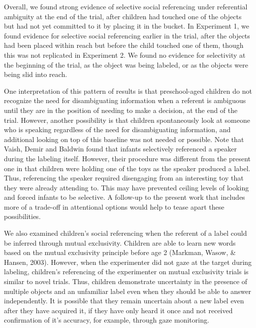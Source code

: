 \documentclass[10pt, letterpaper]{article}
\begin{document}
Overall, we found strong evidence of selective social referencing under
referential ambiguity at the end of the trial, after children had
touched one of the objects but had not yet committed to it by placing it
in the bucket. In Experiment 1, we found evidence for selective social
referencing earlier in the trial, after the objects had been placed
within reach but before the child touched one of them, though this was
not replicated in Experiment 2. We found no evidence for selectivity at
the beginning of the trial, as the object was being labeled, or as the
objects were being slid into reach.

One interpretation of this pattern of results is that preschool-aged
children do not recognize the need for disambiguating information when a
referent is ambiguous until they are in the position of needing to make
a decision, at the end of the trial. However, another possibility is
that children spontaneously look at someone who is speaking regardless
of the need for disambiguating information, and additional looking on
top of this baseline was not needed or possible. Note that Vaish, Demir
and Baldwin found that infants selectively referenced a speaker during
the labeling itself. However, their procedure was different from the
present one in that children were holding one of the toys as the speaker
produced a label. Thus, referencing the speaker required disengaging
from an interesting toy that they were already attending to. This may
have prevented ceiling levels of looking and forced infants to be
selective. A follow-up to the present work that includes more of a
trade-off in attentional options would help to tease apart these
possibilities.

We also examined children's social referencing when the referent of a
label could be inferred through mutual exclusivity. Children are able to
learn new words based on the mutual exclusivity principle before age 2
(Markman, Wasow, \& Hansen, 2003). However, when the experimenter did
not gaze at the target during labeling, children's referencing of the
experimenter on mutual exclusivity trials is similar to novel trials.
Thus, children demonstrate uncertainty in the presence of multiple
objects and an unfamiliar label even when they should be able to answer
independently. It is possible that they remain uncertain about a new
label even after they have acquired it, if they have only heard it once
and not received confirmation of it's accuracy, for example, through
gaze monitoring.
\end{document}

